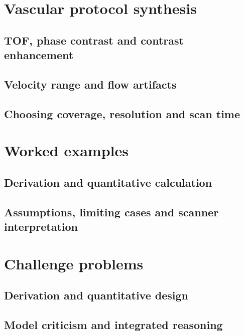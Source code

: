 \section{Vascular protocol synthesis}
\label{sec:23:vascular-protocol-synthesis}
\subsection{TOF, phase contrast and contrast enhancement}
\subsection{Velocity range and flow artifacts}
\subsection{Choosing coverage, resolution and scan time}

\section{Worked examples}
\label{sec:23:worked-examples}
\subsection{Derivation and quantitative calculation}
\subsection{Assumptions, limiting cases and scanner interpretation}

\section{Challenge problems}
\label{sec:23:challenge-problems}
\subsection{Derivation and quantitative design}
\subsection{Model criticism and integrated reasoning}
